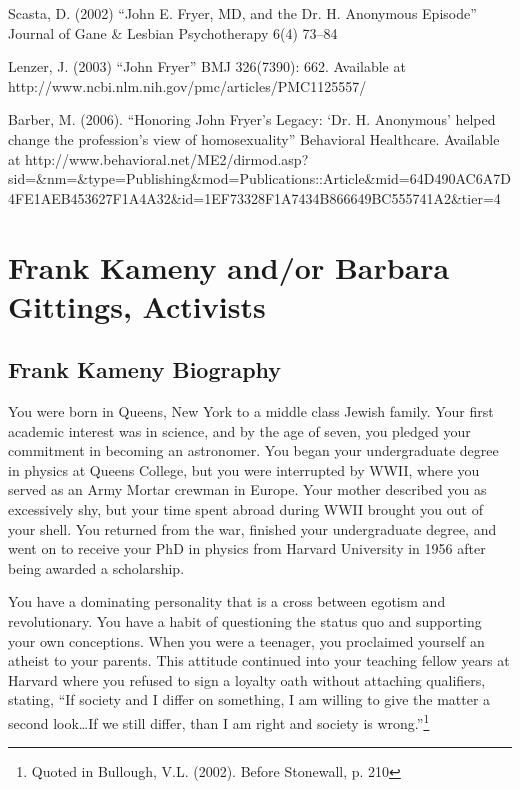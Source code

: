 \begin{refsection}
Scasta, D. (2002) ``John E. Fryer, MD, and the Dr. H. Anonymous Episode'' Journal of Gane \& Lesbian Psychotherapy 6(4) 73--84

Lenzer, J. (2003) ``John Fryer'' BMJ 326(7390): 662. Available at http:\slash \slash www.ncbi.nlm.nih.gov\slash pmc\slash articles\slash PMC1125557\slash 

Barber, M. (2006). ``Honoring John Fryer's Legacy: `Dr. H. Anonymous' helped change the profession's view of homosexuality'' Behavioral Healthcare. Available at http:\slash \slash www.behavioral.net\slash ME2\slash dirmod.asp?sid=\&nm=\&type=Publishing\&mod=Publications::Article\&mid=64D490AC6A7D4FE1AEB453627F1A4A32\&id=1EF73328F1A7434B866649BC555741A2\&tier=4

\chapter{Frank Kameny and\slash or Barbara Gittings, Activists}
\label{frankkamenyandorbarbaragittingsactivists}

\section{Frank Kameny Biography}
\label{frankkamenybiography}

You were born in Queens, New York to a middle class Jewish family. Your first academic interest was in science, and by the age of seven, you pledged your commitment in becoming an astronomer. You began your undergraduate degree in physics at Queens College, but you were interrupted by WWII, where you served as an Army Mortar crewman in Europe. Your mother described you as excessively shy, but your time spent abroad during WWII brought you out of your shell. You returned from the war, finished your undergraduate degree, and went on to receive your PhD in physics from Harvard University in 1956 after being awarded a scholarship.

You have a dominating personality that is a cross between egotism and revolutionary. You have a habit of questioning the status quo and supporting your own conceptions. When you were a teenager, you proclaimed yourself an atheist to your parents. This attitude continued into your teaching fellow years at Harvard where you refused to sign a loyalty oath without attaching qualifiers, stating, ``If society and I differ on something, I am willing to give the matter a second look{\ldots}If we still differ, than I am right and society is wrong.''\footnote{Quoted in Bullough, V.L. (2002). Before Stonewall, p. 210}


\end{refsection}

